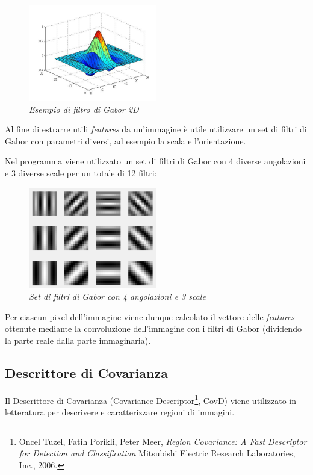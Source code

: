 \begin{figure}[H] 
  \centering
    \includegraphics[width=0.5\textwidth]{images/gaborfilter.jpg}
    \vspace{-0.5cm}
    \caption{{\small \textit{Esempio di filtro di Gabor 2D}}}
\end{figure}

Al fine di estrarre utili \emph{features} da un'immagine è utile utilizzare un set di filtri di Gabor con parametri diversi, ad esempio la scala e l'orientazione.

Nel programma viene utilizzato un set di filtri di Gabor con 4 diverse angolazioni e 3 diverse scale per un totale di 12 filtri:

\begin{figure}[H] 
  \centering
    \includegraphics[width=0.5\textwidth]{images/filterbank.png}
    \caption{{\small \textit{Set di filtri di Gabor con 4 angolazioni e 3 scale}}}
\end{figure}

Per ciascun pixel dell'immagine viene dunque calcolato il vettore delle \emph{features} ottenute mediante la convoluzione dell'immagine con i filtri di Gabor (dividendo la parte reale dalla parte immaginaria).

\subsection{Descrittore di Covarianza}

Il Descrittore di Covarianza (Covariance Descriptor\footnote{Oncel Tuzel, Fatih Porikli, Peter Meer, \emph{Region Covariance: A Fast Descriptor for
Detection and Classification} Mitsubishi Electric Research Laboratories, Inc., 2006.}, CovD) viene utilizzato in letteratura per descrivere e caratterizzare regioni di immagini. 

